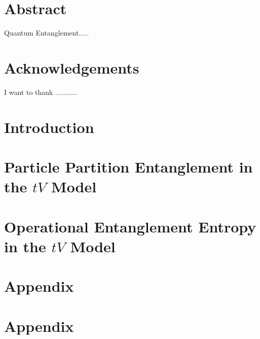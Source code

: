 \documentclass[12pt, two sided]{report}
\begin{document}




\chapter*{Abstract}
Quantum Entanglement.....

\chapter*{Acknowledgements}
I want to thank ...........

\tableofcontents

\chapter{Introduction}


\chapter{Particle Partition Entanglement in the $tV$ Model}


\chapter{Operational Entanglement Entropy in the $tV$ Model}


\appendix
\chapter{Appendix}


\chapter{Appendix}


{} 

\end{document}
